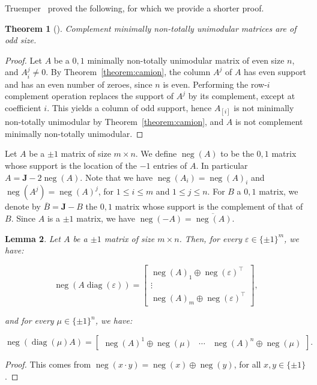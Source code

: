\documentclass[11pt,a4paper]{amsart}
\renewcommand*{\leq}{\leqslant}
\theoremstyle{plain}
\newtheorem{theorem}{Theorem}[section]%
\newtheorem{lemma}[theorem]{Lemma}
\theoremstyle{definition}
\DeclareMathOperator{\diag}{diag}
\DeclareMathOperator{\nega}{neg}
\begin{document}
Truemper~\cite{Truemper_1980} proved the following, for which we provide a shorter proof.
\begin{theorem}[\cite{Truemper_1980}]\label{theorem:Truemper_complement}
Complement minimally non-totally unimodular matrices are of odd size.
\end{theorem}
\begin{proof}
Let $A$ be a $0,\!1$ minimally non-totally unimodular matrix of even size $n$, and $A_i^j\neq 0$.
By Theorem~\ref{theorem:camion}, the column $A^j$ of $A$ has even support and has an even number of zeroes, since $n$ is even.
Performing the row-$i$ complement operation replaces the support of $A^j$ by its complement, except at coefficient $i$.
This yields a column of odd support, hence $A_{[i]}$ is not minimally non-totally unimodular
by Theorem~\ref{theorem:camion}, and $A$ is not complement minimally non-totally unimodular.
\end{proof}

Let $A$ be a $\pm1$ matrix of size $m\times n$. We define $\nega(A)$ to be the $0,\!1$ matrix whose support is the location of the $-1$ entries of $A$.
In particular $A=\mathbf{J}-2\nega(A)$.
Note that we have $\nega(A_i) = \nega(A)_i$ and $\nega (A^j)=\nega(A)^j$, for $1\leq i\leq m$ and $1\leq j \leq n$.
For $B$ a $0,\!1$ matrix, we denote by $\overline{B} = \mathbf{J} - B$ the $0,\!1$ matrix whose support is the complement of that of $B$.
Since $A$ is a $\pm1$ matrix, we have $\nega(-A) = \overline{\nega(A)}$.


\begin{lemma}\label{lemma:correspondence_sign}
Let $A$ be a $\pm1$ matrix of size $m\times n$. Then, for every $\varepsilon \in \{\pm1\}^m$, we have:

$$\nega{(A\diag(\varepsilon))} =\begin{bmatrix}
\nega{(A)}_1 \oplus \nega{(\varepsilon)}^\top\\
\vdots \\
\nega{(A)}_m \oplus \nega{(\varepsilon)}^\top
\end{bmatrix},$$

and for every $\mu \in \{\pm1\}^n$, we have:

$$\nega{(\diag(\mu)A)} =\begin{bmatrix}
\nega{(A)}^1 \oplus \nega{(\mu)} &\cdots &
\nega{(A)}^n \oplus \nega{(\mu)}
\end{bmatrix}.$$
\end{lemma}
\begin{proof}
This comes from $\nega(x\cdot y) = \nega(x)\oplus \nega(y)$, for all $x,y\in\{\pm1\}$.
\end{proof}
\end{document}
